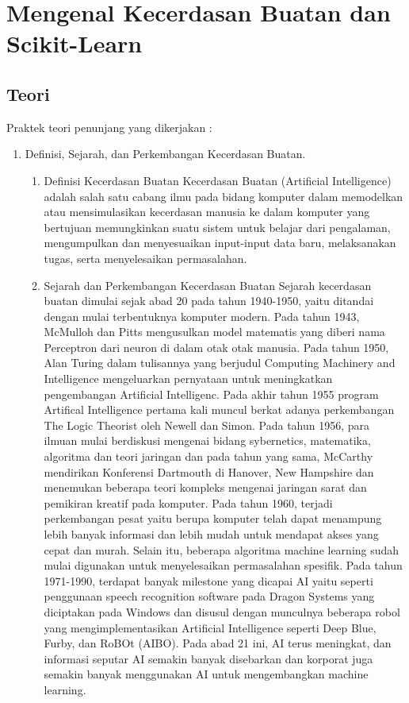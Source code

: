 \chapter{Mengenal Kecerdasan Buatan dan Scikit-Learn}
\section{Teori}
Praktek teori penunjang yang dikerjakan :
\begin{enumerate}
\item
Definisi, Sejarah, dan Perkembangan Kecerdasan Buatan.
	
	\begin{enumerate}
		\item Definisi Kecerdasan Buatan
		\newline Kecerdasan Buatan (Artificial Intelligence) adalah salah satu cabang ilmu pada bidang komputer dalam memodelkan atau mensimulasikan kecerdasan manusia ke dalam komputer yang bertujuan memungkinkan suatu sistem untuk belajar dari pengalaman, mengumpulkan dan menyesuaikan input-input data baru, melaksanakan tugas, serta menyelesaikan permasalahan.
	
		\item Sejarah dan Perkembangan Kecerdasan Buatan
		\newline Sejarah kecerdasan buatan dimulai sejak abad 20 pada tahun 1940-1950, yaitu ditandai dengan mulai terbentuknya komputer modern. Pada tahun 1943, McMulloh dan Pitts mengusulkan model matematis yang diberi nama Perceptron dari neuron di dalam otak otak manusia. Pada tahun 1950, Alan Turing dalam tulisannya yang berjudul Computing Machinery and Intelligence mengeluarkan pernyataan untuk meningkatkan pengembangan Artificial Intelligenc. Pada akhir tahun 1955 program Artifical Intelligence pertama kali muncul berkat adanya perkembangan The Logic Theorist oleh Newell dan Simon. Pada tahun 1956, para ilmuan mulai berdiskusi mengenai bidang sybernetics, matematika, algoritma dan teori jaringan dan pada tahun yang sama, McCarthy mendirikan Konferensi Dartmouth di Hanover, New Hampshire dan menemukan beberapa teori kompleks mengenai jaringan sarat dan pemikiran kreatif pada komputer. Pada tahun 1960, terjadi perkembangan pesat yaitu berupa komputer telah dapat menampung lebih banyak informasi dan lebih mudah untuk mendapat akses yang cepat dan murah. Selain itu, beberapa algoritma machine learning sudah mulai digunakan untuk menyelesaikan permasalahan spesifik. Pada tahun 1971-1990, terdapat banyak milestone yang dicapai AI yaitu seperti penggunaan speech recognition software pada Dragon Systems yang diciptakan pada Windows dan disusul dengan munculnya beberapa robol yang mengimplementasikan Artificial Intelligence seperti Deep Blue, Furby, dan RoBOt (AIBO). Pada abad 21 ini, AI terus meningkat, dan informasi seputar AI semakin banyak disebarkan dan korporat juga semakin banyak menggunakan AI untuk mengembangkan machine learning.
		

\end{enumerate}
\end{enumerate}
